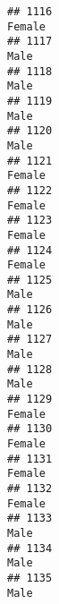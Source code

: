 \documentclass[]{article}
\begin{document}
\begin{verbatim}
## 1116                                                                                                                          Female
## 1117                                                                                                                            Male
## 1118                                                                                                                            Male
## 1119                                                                                                                            Male
## 1120                                                                                                                            Male
## 1121                                                                                                                          Female
## 1122                                                                                                                          Female
## 1123                                                                                                                          Female
## 1124                                                                                                                          Female
## 1125                                                                                                                            Male
## 1126                                                                                                                            Male
## 1127                                                                                                                            Male
## 1128                                                                                                                            Male
## 1129                                                                                                                          Female
## 1130                                                                                                                          Female
## 1131                                                                                                                          Female
## 1132                                                                                                                          Female
## 1133                                                                                                                            Male
## 1134                                                                                                                            Male
## 1135                                                                                                                            Male

\end{verbatim}
\end{document}
